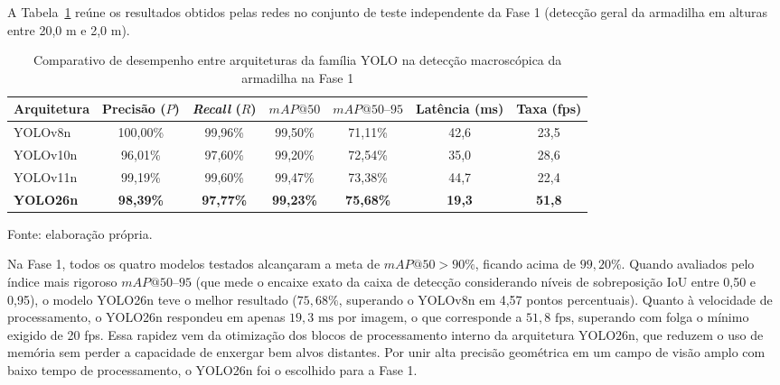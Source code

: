 A Tabela~\ref{tab:comparativo_yolo_fase1_resultados} reúne os resultados obtidos pelas redes no conjunto de teste independente da Fase 1 (detecção geral da armadilha em alturas entre 20,0 m e 2,0 m).

\begin{table}[H]
	\centering
	\footnotesize
	\setlength{\tabcolsep}{3.5pt}
	\captionsetup{justification=centering}
	\caption{Comparativo de desempenho entre arquiteturas da família YOLO na detecção macroscópica da armadilha na Fase 1}
	\label{tab:comparativo_yolo_fase1_resultados}
	\vspace{0.2cm}
	\begin{tabular}{lcccccc}
		\hline
		\textbf{Arquitetura} & \textbf{Precisão ($P$)} & \textbf{\textit{Recall} ($R$)} & \textbf{$mAP@50$} & \textbf{$mAP@50\text{--}95$} & \textbf{Latência (ms)} & \textbf{Taxa (fps)} \\
		\hline
		YOLOv8n    & 100,00\%     & 99,96\%    & 99,50\%    & 71,11\%         & 42,6           & 23,5 \\
		YOLOv10n   & 96,01\%      & 97,60\%    & 99,20\%    & 72,54\%         & 35,0           & 28,6 \\
		YOLOv11n   & 99,19\%      & 99,60\%    & 99,47\%    & 73,38\%         & 44,7           & 22,4 \\
		\textbf{YOLO26n} & \textbf{98,39\%} & \textbf{97,77\%} & \textbf{99,23\%} & \textbf{75,68\%} & \textbf{19,3} & \textbf{51,8} \\
		\hline
	\end{tabular}
	\vspace{0.2cm}
	\begin{flushleft}
		\footnotesize Fonte: elaboração própria.
	\end{flushleft}
\end{table}

Na Fase 1, todos os quatro modelos testados alcançaram a meta de $mAP@50 > 90\%$, ficando acima de $99{,}20\%$. Quando avaliados pelo índice mais rigoroso $mAP@50\text{--}95$ (que mede o encaixe exato da caixa de detecção considerando níveis de sobreposição IoU entre 0,50 e 0,95), o modelo YOLO26n teve o melhor resultado ($75{,}68\%$, superando o YOLOv8n em 4,57 pontos percentuais). Quanto à velocidade de processamento, o YOLO26n respondeu em apenas $19{,}3\text{ ms}$ por imagem, o que corresponde a $51{,}8\text{ fps}$, superando com folga o mínimo exigido de 20 fps. Essa rapidez vem da otimização dos blocos de processamento interno da arquitetura YOLO26n, que reduzem o uso de memória sem perder a capacidade de enxergar bem alvos distantes. Por unir alta precisão geométrica em um campo de visão amplo com baixo tempo de processamento, o YOLO26n foi o escolhido para a Fase 1.

